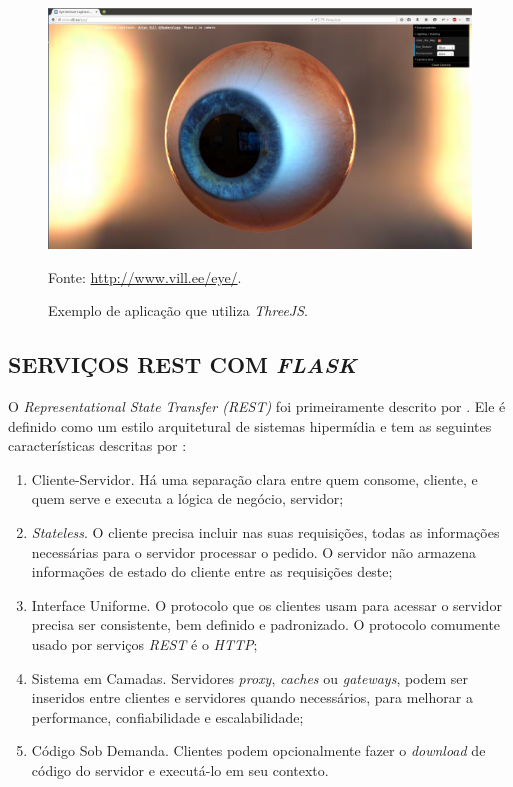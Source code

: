 \begin{figure}[ht]
	\centering
	\includegraphics[width=14cm]{figuras/evil_eye.eps}
	\caption{Exemplo de aplicação que utiliza \emph{ThreeJS}.}
	\label{evil_eye}
	\footnotesize Fonte: \url{http://www.vill.ee/eye/}.
\end{figure}


\subsection{SERVIÇOS REST COM \emph{FLASK}}
\label{servicos_rest}

O \emph{Representational State Transfer (REST)} foi primeiramente descrito por . 
Ele é definido como um estilo arquitetural de sistemas hipermídia e tem as seguintes características descritas por :

\begin{enumerate}
	\item Cliente-Servidor. Há uma separação clara entre quem consome, cliente, e quem serve e executa a lógica de negócio, servidor;
	\item \emph{Stateless}. O cliente precisa incluir nas suas requisições, todas as informações necessárias para o servidor processar o pedido. O servidor não armazena informações de estado do cliente entre as requisições deste;
	\item Interface Uniforme. O protocolo que os clientes usam para acessar o servidor precisa ser consistente, bem definido e padronizado. O protocolo comumente usado por serviços \emph{REST} é o \emph{HTTP};
	\item Sistema em Camadas. Servidores \emph{proxy}, \emph{caches} ou \emph{gateways}, podem ser inseridos entre clientes e servidores quando necessários, para melhorar a performance, confiabilidade e escalabilidade;
	\item Código Sob Demanda. Clientes podem opcionalmente fazer o \emph{download} de código do servidor e executá-lo em seu contexto.
\end{enumerate}

